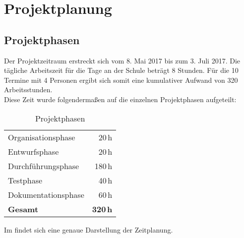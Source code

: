 \section{Projektplanung} 
\label{sec:Projektplanung}


\subsection{Projektphasen}
\label{sec:Projektphasen}
	Der Projektzeitraum erstreckt sich vom 8. Mai 2017 bis zum 3. Juli 2017. Die tägliche Arbeitszeit für die Tage an der Schule beträgt 8 Stunden. Für die 10 Termine mit 4 Personen ergibt sich somit eine kumulativer Aufwand von 320 Arbeitsstunden.\\
	 Diese Zeit wurde folgendermaßen auf die einzelnen Projektphasen aufgeteilt:
     \begin{table}[H]
         \caption{Projektphasen}
         \begin{center}
             \begin{tabular}{lr}
             	Organisationsphase & 20\,h\\
                Entwurfsphase & 20\,h\\
                Durchführungsphase & 180\,h\\
                Testphase & 40\,h\\
                Dokumentationsphase & 60\,h\\\hline
                \textbf{Gesamt} & \textbf{320\,h}
             \end{tabular}
         \end{center}
     \end{table}
Im  findet sich eine genaue Darstellung der Zeitplanung.

